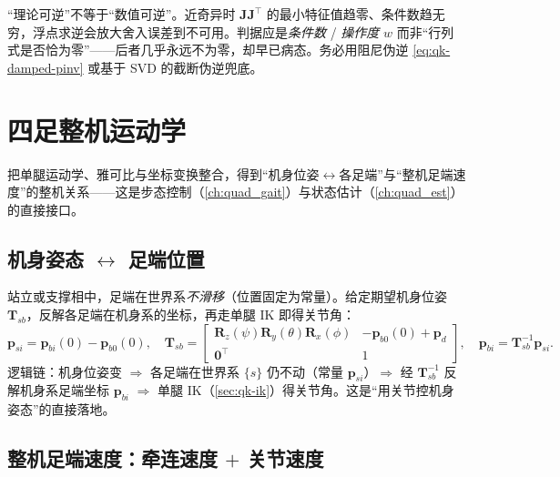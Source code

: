 \begin{pitfall}
“理论可逆”不等于“数值可逆”。近奇异时 $\mathbf{J}\mathbf{J}^\top$ 的最小特征值趋零、条件数趋无穷，浮点求逆会放大舍入误差到不可用。判据应是\emph{条件数} / \emph{操作度} $w$ 而非“行列式是否恰为零”——后者几乎永远不为零，却早已病态。务必用阻尼伪逆 \cref{eq:qk-damped-pinv} 或基于 SVD 的截断伪逆兜底。
\end{pitfall}

\section{四足整机运动学}
\label{sec:qk-wholebody}

把单腿运动学、雅可比与坐标变换整合，得到“机身位姿$\leftrightarrow$各足端”与“整机足端速度”的整机关系——这是步态控制（\cref{ch:quad_gait}）与状态估计（\cref{ch:quad_est}）的直接接口。

\subsection{机身姿态 $\leftrightarrow$ 足端位置}
\label{subsec:qk-body-foot}

站立或支撑相中，足端在世界系\emph{不滑移}（位置固定为常量）。给定期望机身位姿 $\mathbf{T}_{sb}$，反解各足端在机身系的坐标，再走单腿 IK 即得关节角\cite{unitree2023quadruped}：
\begin{equation}
  \boldsymbol{p}_{si}=\boldsymbol{p}_{bi}(0)-\boldsymbol{p}_{b0}(0),
  \quad
  \mathbf{T}_{sb}=\begin{bmatrix}\mathbf{R}_z(\psi)\mathbf{R}_y(\theta)\mathbf{R}_x(\phi)&-\boldsymbol{p}_{b0}(0)+\boldsymbol{p}_d\\\mathbf{0}^\top&1\end{bmatrix},
  \quad
  \boldsymbol{p}_{bi}=\mathbf{T}_{sb}^{-1}\boldsymbol{p}_{si}.
  \label{eq:qk-body-foot}
\end{equation}
逻辑链：机身位姿变 $\Rightarrow$ 各足端在世界系 $\{s\}$ 仍不动（常量 $\boldsymbol{p}_{si}$）$\Rightarrow$ 经 $\mathbf{T}_{sb}^{-1}$ 反解机身系足端坐标 $\boldsymbol{p}_{bi}$ $\Rightarrow$ 单腿 IK（\cref{sec:qk-ik}）得关节角。这是“用关节控机身姿态”的直接落地。

\subsection{整机足端速度：牵连速度 $+$ 关节速度}
\label{subsec:qk-foot-vel}

